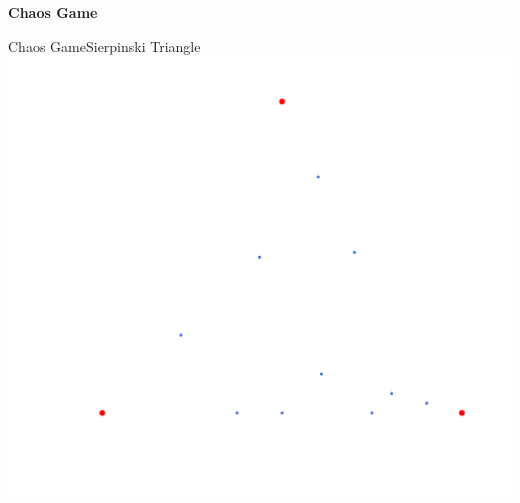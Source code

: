\documentclass[usenames,dvipsnames,svgnames,10pt,aspectratio=169]{beamer}
\begin{document}


\begin{frame}[t, c]{}
	\centering
	\vspace{1cm}

	{\Large \textbf{Chaos Game}}

	\bigskip

	{}

\end{frame}

\begin{frame}[t, c]{Chaos Game}{Sierpinski Triangle}
	\centering
	\includegraphics[height=.9\textheight]{sierpinsky_0}
	\vspace{2cm}
\end{frame}
\end{document}

